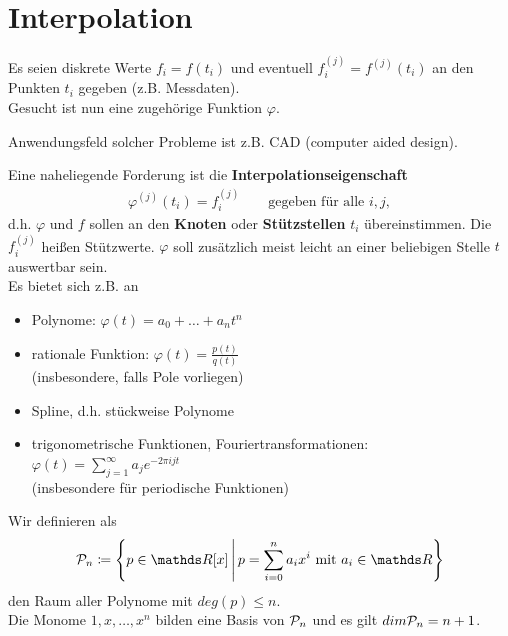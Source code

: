 % 
% 
% 
% 


\chapter{Interpolation}

Es seien diskrete Werte $f_i=f(t_i)$ und 
eventuell $f_i^{(j)} = f^{(j)}(t_i)$ 
an den Punkten $t_i$ gegeben (z.B. Messdaten).\\
Gesucht ist nun eine zugehörige Funktion $\varphi$.

Anwendungsfeld solcher Probleme ist z.B. CAD (computer aided
design).

Eine naheliegende Forderung ist die
\textbf{Interpolationseigenschaft}
\begin{gather*}
  \varphi^{(j)} (t_i) = f_i^{(j)}\qquad \text{gegeben für alle } i,j ,
\end{gather*}
d.h. $\varphi$ und $f$ sollen an den \textbf{Knoten} oder 
\textbf{Stützstellen} $t_i$ übereinstimmen.
Die $f_i^{(j)}$ heißen Stützwerte.
\label{im6.1}
$\varphi$ soll zusätzlich meist leicht an einer beliebigen Stelle $t$
auswertbar sein. \\
Es bietet sich z.B. an 
\begin{itemize}
\item Polynome: $\varphi(t) = a_0+\dots +a_n t^n$
\item rationale Funktion: $\varphi(t) = \frac{p(t)}{q(t)} $\\
  (insbesondere, falls Pole vorliegen)
\item Spline, d.h. stückweise Polynome
\item trigonometrische Funktionen, Fouriertransformationen:\\
  $ \varphi (t) = \sum_{j=1}^{\infty} a_je^{-2\pi ijt}$\\
  (insbesondere für periodische Funktionen)
\end{itemize}

Wir definieren als 
\begin{gather}
  \p_n \coloneqq \left\{ p \in \R[x]\,\middle\vert\,
    p= \sum_{i=0}^{n} a_ix^i \text{ mit } a_i\in\R \right\}
  \label{VI.1.1}
\end{gather}
den Raum aller Polynome mit $deg(p)\leq n$.\\
Die Monome $1,x, \dots , x^n$ bilden eine Basis von $\mathcal{P}_n$
und es gilt $dim\mathcal{P}_n = n+1$.

